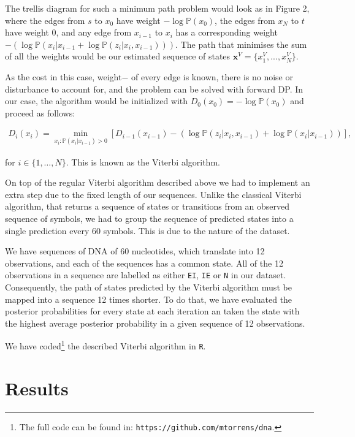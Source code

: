 \documentclass[a4paper, 11pt]{article} %
\begin{document}
The trellis diagram for such a minimum path problem would look as in Figure 2, where the edges from $s$ to $x_{0}$ have weight $-\log \mathbb{P}(x_{0})$, the edges from $x_{N}$ to $t$ have weight 0, and any edge from $x_{i-1}$ to $x_{i}$ has a corresponding weight $-\left( \log \mathbb{P}(x_{i}|x_{i-1} + \log \mathbb{P}(z_{i}|x_{i}, x_{i-1})) \right)$. The path that minimises the sum of all the weights would be our estimated sequence of states $\textbf{x}^V = \{ x_{1}^V, ..., x_N^V \}$.

As the cost \textendash in this case, weight$-$ of every edge is known, there is no noise or disturbance to account for, and the problem can be solved with forward DP. In our case, the algorithm would be initialized with $D_{0}(x_{0}) = -\log \mathbb{P}(x_{0})$ and proceed as follows:

\begin{eqnarray}
D_{i}(x_{i}) = \min_{ x_i: \mathbb{P}(x_i | x_{i-1}) > 0} \left[ D_{i-1}(x_{i-1}) - \left( \log \mathbb{P}(z_i | x_i, x_{i-1}) + \log \mathbb{P}(x_i | x_{i-1}) \right) \right],  \nonumber
\end{eqnarray}

for $i \in \{ 1, \dots, N \}$. This is known as the Viterbi algorithm.

On top of the regular Viterbi algorithm described above we had to implement an extra step due to the fixed length of our sequences. Unlike the classical Viterbi algorithm, that returns a sequence of states or transitions from an observed sequence of symbols, we had to group the sequence of predicted states into a single prediction every 60 symbols. This is due to the nature of the dataset. 

We have sequences of DNA of 60 nucleotides, which translate into 12 observations, and each of the sequences has a common state. All of the 12 observations in a sequence are labelled as either \texttt{EI}, \texttt{IE} or \texttt{N} in our dataset. Consequently, the path of states predicted by the Viterbi algorithm must be mapped into a sequence 12 times shorter. To do that, we have evaluated the posterior probabilities for every state at each iteration an taken the state with the highest average posterior probability in a given sequence of 12 observations. 

We have coded\footnote{The full code can be found in: \texttt{https://github.com/mtorrens/dna}.} the described Viterbi algorithm in \texttt{R}. 

\section*{Results}
\end{document}
